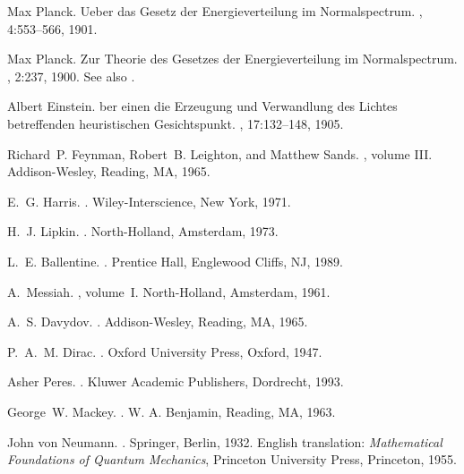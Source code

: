 \documentclass [11pt]{llncs}
\begin{document}
\begin{thebibliography}{10}
Max Planck.
\newblock Ueber das {G}esetz der {E}nergieverteilung im {N}ormalspectrum.
, 4:553--566, 1901.

Max Planck.
\newblock Zur {T}heorie des {G}esetzes der {E}nergieverteilung im
  {N}ormalspectrum.
, 2:237,
  1900.
\newblock See also \cite{planck:1901b}.

Albert Einstein.
ber einen die {E}rzeugung und {V}erwandlung des {L}ichtes
  betreffenden heuristischen {G}esichtspunkt.
, 17:132--148, 1905.

Richard~P. Feynman, Robert~B. Leighton, and Matthew Sands.
, volume III.
\newblock Addison-Wesley, Reading, MA, 1965.

E.~G. Harris.
.
\newblock Wiley-Interscience, New York, 1971.

H.~J. Lipkin.
.
\newblock North-Holland, Amsterdam, 1973.

L.~E. Ballentine.
.
\newblock Prentice Hall, Englewood Cliffs, NJ, 1989.

A.~Messiah.
, volume~I.
\newblock North-Holland, Amsterdam, 1961.

A.~S. Davydov.
.
\newblock Addison-Wesley, Reading, MA, 1965.

P.~A.~M. Dirac.
.
\newblock Oxford University Press, Oxford, 1947.

Asher Peres.
.
\newblock Kluwer Academic Publishers, Dordrecht, 1993.

George~W. Mackey.
.
\newblock W. A. Benjamin, Reading, MA, 1963.

John von Neumann.
.
\newblock Springer, Berlin, 1932.
\newblock English translation: {\sl Mathematical Foundations of Quantum
  Mechanics}, Princeton University Press, Princeton, 1955.


\end{thebibliography}
\end{document}

